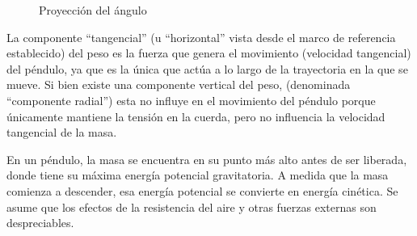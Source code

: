\documentclass[twocolumn]{article}
\numberwithin{table}{section}
\begin{document}
\begin{figure}[ht]
  \centering
  \caption{Proyección del ángulo}
\end{figure}

La componente “tangencial” (u “horizontal” vista desde el marco de
referencia establecido) del peso es la fuerza que genera el
movimiento (velocidad tangencial) del péndulo, ya que es la única que
actúa a lo largo de la trayectoria en la que se mueve. Si bien existe
una componente vertical del peso, (denominada “componente radial”)
esta no influye en el movimiento del péndulo porque únicamente
mantiene la tensión en la cuerda, pero no influencia la velocidad
tangencial de la masa.

En un péndulo, la masa se encuentra en su punto más alto antes de ser
liberada, donde tiene su máxima energía potencial gravitatoria. A
medida que la masa comienza a descender, esa energía potencial se
convierte en energía cinética. Se asume que los efectos de la
resistencia del aire y otras fuerzas externas son despreciables.
\end{document}
